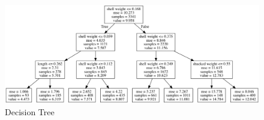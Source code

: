 \begin{figure}[htb]
    \centering
    \includegraphics[width=1\textwidth]{images/decision_tree.png}
    \caption{Decision Tree}
    \label{figure:decision_tree}
\end{figure}